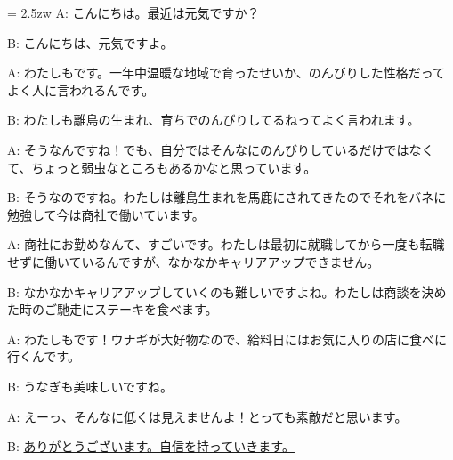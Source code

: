 \documentclass[11pt]{amsart}
\title{}
\author{}
\newenvironment{hangall}[1]{\hangindent = 2.5zw\everypar{\hangindent = 2.5zw}}{}
\begin{document}
\maketitle
\begin{hangall}{}%
A: こんにちは。最近は元気ですか？

B: こんにちは、元気ですよ。

A: わたしもです。一年中温暖な地域で育ったせいか、のんびりした性格だってよく人に言われるんです。

B: わたしも離島の生まれ、育ちでのんびりしてるねってよく言われます。

A: そうなんですね！でも、自分ではそんなにのんびりしているだけではなくて、ちょっと弱虫なところもあるかなと思っています。

B: そうなのですね。わたしは離島生まれを馬鹿にされてきたのでそれをバネに勉強して今は商社で働いています。

A: 商社にお勤めなんて、すごいです。わたしは最初に就職してから一度も転職せずに働いているんですが、なかなかキャリアアップできません。

B: なかなかキャリアアップしていくのも難しいですよね。わたしは商談を決めた時のご馳走にステーキを食べます。

A: わたしもです！ウナギが大好物なので、給料日にはお気に入りの店に食べに行くんです。

B: うなぎも美味しいですね。

A: えーっ、そんなに低くは見えませんよ！とっても素敵だと思います。

B: \ul{ありがとうございます。自信を持っていきます。}\end{hangall}
\end{document}
